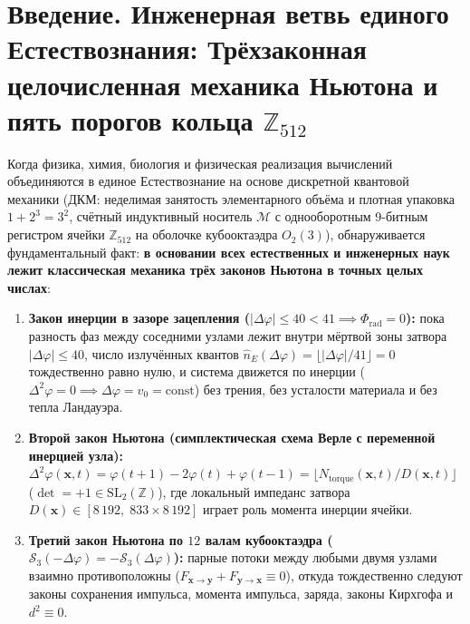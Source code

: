 
\chapter*{Введение. Инженерная ветвь единого Естествознания: Трёхзаконная целочисленная механика Ньютона и пять порогов кольца \texorpdfstring{$\mathbb{Z}_{512}$}{Z512}}

Когда физика, химия, биология и физическая реализация вычислений объединяются в единое Естествознание на основе дискретной квантовой механики (ДКМ: неделимая занятость элементарного объёма и плотная упаковка $1 + 2^3 = 3^2$, счётный индуктивный носитель $\mathcal{M}$ с однооборотным 9-битным регистром ячейки $\mathbb{Z}_{512}$ на оболочке кубооктаэдра $O_2(3)$), обнаруживается фундаментальный факт: \textbf{в основании всех естественных и инженерных наук лежит классическая механика трёх законов Ньютона в точных целых числах}:
\begin{enumerate}[label=\textbf{Закон Ньютона \Roman*.},leftmargin=*,noitemsep]
\item \textbf{Закон инерции в зазоре зацепления ($|\Delta\varphi|\le 40 < 41 \implies \Phi_{\mathrm{rad}} = 0$):}
  пока разность фаз между соседними узлами лежит внутри мёртвой зоны затвора $|\Delta\varphi|\le 40$, число излучённых квантов $\hat{n}_E(\Delta\varphi) = \lfloor|\Delta\varphi|/41\rfloor = 0$ тождественно равно нулю, и система движется по инерции ($\Delta^2\varphi = 0 \implies \Delta\varphi = v_0 = \mathrm{const}$) без трения, без усталости материала и без тепла Ландауэра.
\item \textbf{Второй закон Ньютона (симплектическая схема Верле с переменной инерцией узла):}
  $\Delta^2\varphi(\mathbf{x},t) = \varphi(t+1)-2\varphi(t)+\varphi(t-1) = \lfloor N_{\mathrm{torque}}(\mathbf{x},t)/D(\mathbf{x},t)\rfloor$ ($\det = +1\in\mathrm{SL}_2(\mathbb{Z})$), где локальный импеданс затвора $D(\mathbf{x})\in[8\,192,\; 833\times 8\,192]$ играет роль момента инерции ячейки.
\item \textbf{Третий закон Ньютона по $12$ валам кубооктаэдра ($\mathcal{S}_3(-\Delta\varphi) = -\mathcal{S}_3(\Delta\varphi)$):}
  парные потоки между любыми двумя узлами взаимно противоположны ($F_{\mathbf{x}\to\mathbf{y}} + F_{\mathbf{y}\to\mathbf{x}} \equiv 0$), откуда тождественно следуют законы сохранения импульса, момента импульса, заряда, законы Кирхгофа и $d^2 \equiv 0$.
\end{enumerate}

